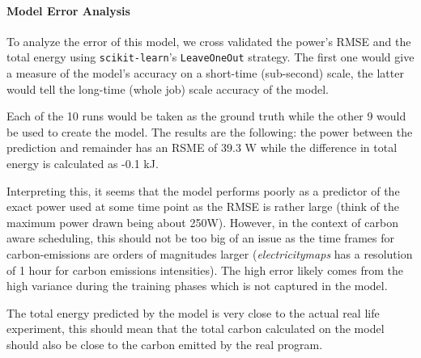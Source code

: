 \paragraph{Model Error Analysis}

To analyze the error of this model, we cross validated the power's RMSE and the total energy using \verb|scikit-learn|'s \verb|LeaveOneOut| strategy. 
The first one would give a measure of the model's accuracy on a short-time (sub-second) scale, the latter would  tell the long-time (whole job) scale accuracy of the model.

Each of the 10 runs would be taken as the ground truth while the other 9 would be used to create the model. 
The results are the following: the power between the prediction and remainder has an RSME of 39.3 W while the difference in total energy is calculated as -0.1 kJ. 

Interpreting this, it seems that the model performs poorly as a predictor of the exact power used at some time point as the RMSE is rather large (think of the maximum power drawn being about 250W). 
However, in the context of carbon aware scheduling, this should not be too big of an issue as the time frames for carbon-emissions are orders of magnitudes larger (\emph{electricitymaps} has a resolution of 1 hour for carbon emissions intensities). 
The high error likely comes from the high variance during the training phases which is not captured in the model.

The total energy predicted by the model is very close to the actual real life experiment, this should mean that the total carbon calculated on the model should also be close to the carbon emitted by the real program.
